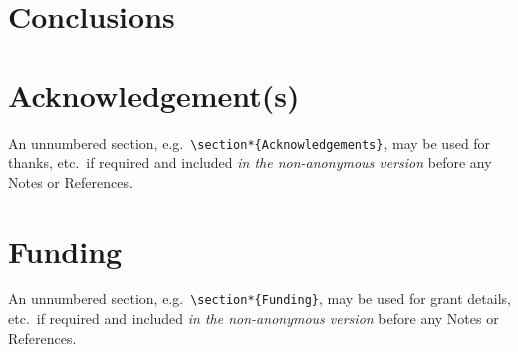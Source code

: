 \documentclass[]{interact}
\theoremstyle{plain}%
\theoremstyle{definition}
\theoremstyle{remark}
\begin{document}
\hypertarget{conclusions}{%
\section{Conclusions}\label{conclusions}}

\hypertarget{acknowledgements}{%
\section*{Acknowledgement(s)}\label{acknowledgements}}

An unnumbered section,
e.g.~\texttt{\textbackslash{}section*\{Acknowledgements\}}, may be used
for thanks, etc.~if required and included \emph{in the non-anonymous
version} before any Notes or References.

\hypertarget{funding}{%
\section*{Funding}\label{funding}}

An unnumbered section,
e.g.~\texttt{\textbackslash{}section*\{Funding\}}, may be used for grant
details, etc.~if required and included \emph{in the non-anonymous
version} before any Notes or References.






\end{document}
